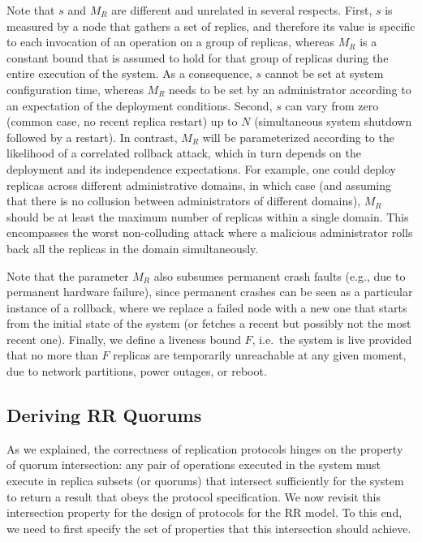 Note that $s$ and $M_R$ are different and unrelated in several
respects. First, $s$ is measured by a node that gathers a set of
replies, and therefore its value is specific to each invocation
of an operation on a group of replicas, whereas $M_R$ is a
constant bound that is assumed to hold for that group of replicas
during the entire execution of the system. As a consequence, $s$
cannot be set at system configuration time, whereas $M_R$ needs
to be set by an administrator according to an expectation of the
deployment conditions. Second, $s$ can vary from zero (common
case, no recent replica restart) up to $N$ (simultaneous system
shutdown followed by a restart). In contrast, $M_R$ will be
parameterized according to the likelihood of a correlated
rollback attack, which in turn depends on the deployment and its
independence expectations. For example, one could deploy replicas
across different administrative domains, in which case (and
assuming that there is no collusion between administrators of
different domains), $M_R$ should be at least the maximum number
of replicas within a single domain. This encompasses the worst
non-colluding attack where a malicious administrator rolls back
all the replicas in the domain simultaneously.

Note that the parameter $M_R$ also subsumes permanent crash
faults (e.g., due to permanent hardware failure), since permanent
crashes can be seen as a particular instance of a rollback, where
we replace a failed node with a new one that starts from the
initial state of the system (or fetches a recent but possibly not
the most recent one).
%
Finally, we define a liveness bound $F$, i.e.\ the system is live
provided that no more than $F$ replicas are temporarily unreachable at
any given moment, due to network partitions, power outages, or reboot.

\subsection{Deriving {\ac{RR} Quorums}}\label{ssec:parameters}

As we explained, the correctness of replication protocols hinges
on the property of quorum intersection: any pair of operations
executed in the system must execute in replica subsets (or
quorums) that intersect sufficiently for the system to return a
result that obeys the protocol specification. We now revisit this
intersection property for the design of protocols for the \ac{RR}
model. To this end, we need to first specify the set of
properties that this intersection should achieve.


